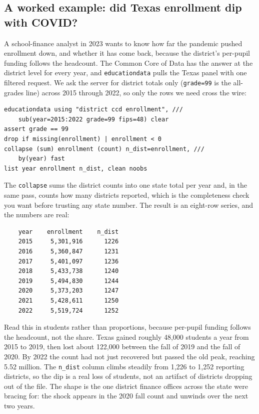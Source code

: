 \documentclass[
    a4paper,
    fontsize=10pt,
    twoside=true,
    numbers=noenddot,
]{kaobook}
\begin{document}
\subsection{A worked example: did Texas enrollment dip with COVID?}\label{sec:ccd}
A school-finance analyst in 2023 wants to know how far the pandemic pushed enrollment down, and whether it has come back, because the district's per-pupil funding follows the headcount. The Common Core of Data has the answer at the district level for every year, and \texttt{educationdata} pulls the Texas panel with one filtered request. We ask the server for district totals only (\texttt{grade=99} is the all-grades line) across 2015 through 2022, so only the rows we need cross the wire:
\par
{\footnotesize
\begin{verbatim}
educationdata using "district ccd enrollment", ///
    sub(year=2015:2022 grade=99 fips=48) clear
assert grade == 99
drop if missing(enrollment) | enrollment < 0
collapse (sum) enrollment (count) n_dist=enrollment, ///
    by(year) fast
list year enrollment n_dist, clean noobs
\end{verbatim}
}
The \texttt{collapse} sums the district counts into one state total per year and, in the same pass, counts how many districts reported, which is the completeness check you want before trusting any state number. The result is an eight-row series, and the numbers are real:
\par
{\footnotesize
\begin{verbatim}
    year    enrollment    n_dist
    2015     5,301,916      1226
    2016     5,360,847      1231
    2017     5,401,097      1236
    2018     5,433,738      1240
    2019     5,494,830      1244
    2020     5,373,203      1247
    2021     5,428,611      1250
    2022     5,519,724      1252
\end{verbatim}
}
Read this in students rather than proportions, because per-pupil funding follows the headcount, not the share. Texas gained roughly 48{,}000 students a year from 2015 to 2019, then lost about 122{,}000 between the fall of 2019 and the fall of 2020. By 2022 the count had not just recovered but passed the old peak, reaching 5.52 million. The \texttt{n\_dist} column climbs steadily from 1{,}226 to 1{,}252 reporting districts, so the dip is a real loss of students, not an artifact of districts dropping out of the file. The shape is the one district finance offices across the state were bracing for: the shock appears in the 2020 fall count and unwinds over the next two years.
\end{document}
